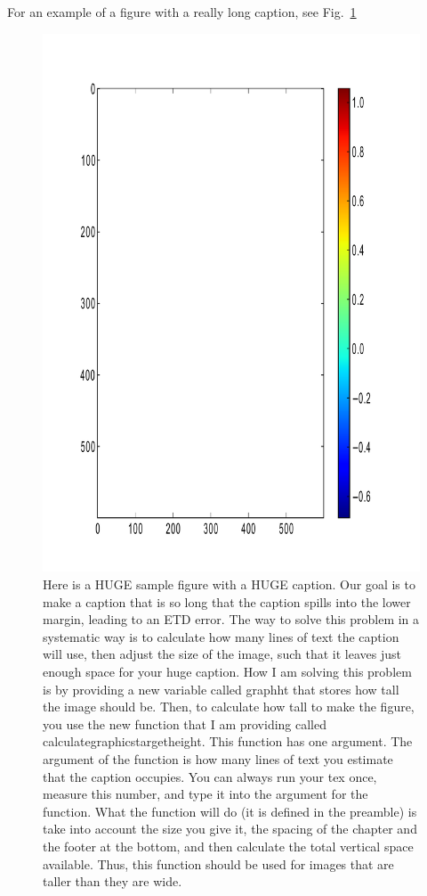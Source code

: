 For an example of a figure with a really long caption, see Fig.~\ref{fig:longcap}
\begin{figure}[hbtp]
\centering
{}
\includegraphics[height=\graphht]{Chapter-2/figs/color_stretched}
\caption{Here is a HUGE sample figure with a HUGE caption. Our goal is to make 
  a caption that is so long that the caption spills into the lower margin, 
  leading to an ETD error. The way to solve this problem in a systematic way is
  to calculate how many lines of text the caption will use, then adjust the size
  of the image, such that it leaves just enough space for your huge caption.
  How I am solving this problem is by providing a new variable called graphht 
  that stores how tall the image should be. Then, to calculate how tall to make 
  the figure, you use the new function that I am providing called
  calculategraphicstargetheight. This function has one argument. The argument
  of the function is how many lines of text you estimate that the caption
  occupies. You can always run your tex once, measure this number, and type it
  into the argument for the function. What the function will do (it is defined 
  in the preamble) is take into account the size you give it, the spacing of the
  chapter and the footer at the bottom, and then calculate the total vertical 
  space available. Thus, this function should be used for images that are taller
  than they are wide.}
\label{fig:longcap}
\end{figure}
